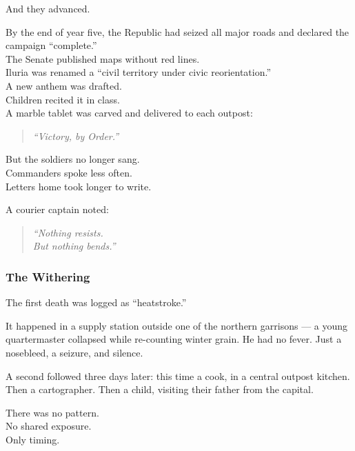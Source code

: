 \documentclass[12pt]{article}
\begin{document}
And they advanced.

\vspace{1em}

By the end of year five, the Republic had seized all major roads and declared the campaign “complete.”\\
The Senate published maps without red lines.\\
Iluria was renamed a “civil territory under civic reorientation.”\\
A new anthem was drafted.\\
Children recited it in class.\\
A marble tablet was carved and delivered to each outpost:

\begin{quote}
\textit{“Victory, by Order.”}
\end{quote}

\vspace{1em}

But the soldiers no longer sang.\\
Commanders spoke less often.\\
Letters home took longer to write.

A courier captain noted:

\begin{quote}
\textit{“Nothing resists.}\\
\textit{But nothing bends.”}
\end{quote}

\dotfill

\subsubsection{The Withering}

The first death was logged as “heatstroke.”

It happened in a supply station outside one of the northern garrisons — a young quartermaster collapsed while re-counting winter grain. He had no fever. Just a nosebleed, a seizure, and silence.

A second followed three days later: this time a cook, in a central outpost kitchen. Then a cartographer. Then a child, visiting their father from the capital.

There was no pattern.\\
No shared exposure.\\
Only timing.

\vspace{1em}
\end{document}
